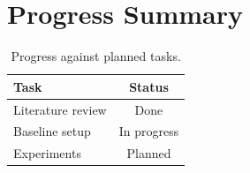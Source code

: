 \section{Progress Summary}
\label{sec:work-progress}


\begin{table}[H]
  \centering
  \caption{Progress against planned tasks.}
  \label{tab:progress}
  \begin{tabular}{lc}
    \toprule
    Task & Status \\
    \midrule
    Literature review & Done \\
    Baseline setup    & In progress \\
    Experiments       & Planned \\
    \bottomrule
  \end{tabular}
\end{table}
